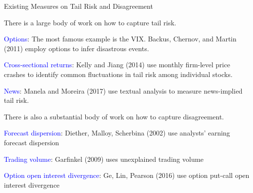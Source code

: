 \documentclass[11pt, aspectratio=169]{beamer}
\newenvironment{wideitemize}{\itemize\addtolength{\itemsep}{10pt}}{\enditemize}
\begin{document}
\begin{frame}{Existing Measures on Tail Risk and Disagreement}
    \begin{wideitemize}
    \item There is a large body of work on how to capture tail risk.
    \begin{wideitemize}
        \item \textcolor{blue}{Options}: The most famous example is the VIX. Backus, Chernov, and Martin (2011) employ options to infer disastrous events. 
        \vspace{-0.2 cm}
        \item \textcolor{blue}{Cross-sectional returns}: Kelly and Jiang (2014) use monthly firm-level price crashes to identify common fluctuations in tail risk among individual stocks.
         \vspace{-0.2 cm}
        \item \textcolor{blue}{News}: Manela and Moreira (2017) use textual analysis to measure news-implied tail risk.
    \end{wideitemize}
    \item There is also a substantial body of work on how to capture disagreement.
    \begin{wideitemize}
        \item \textcolor{blue}{Forecast dispersion}: Diether, Malloy, Scherbina (2002) use analysts' earning forecast dispersion
         \vspace{-0.2 cm}
        \item \textcolor{blue}{Trading volume}: Garfinkel (2009) uses unexplained trading volume
         \vspace{-0.2 cm}
        \item \textcolor{blue}{Option open interest divergence}: Ge, Lin, Pearson (2016) use option put-call open interest divergence
    \end{wideitemize}
    \end{wideitemize}
\end{frame}
\end{document}
